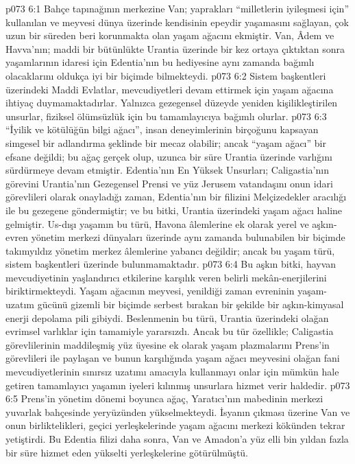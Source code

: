 \vs p073 6:1 Bahçe tapınağının merkezine Van; yaprakları “milletlerin iyileşmesi için” kullanılan ve meyvesi dünya üzerinde kendisinin epeydir yaşamasını sağlayan, çok uzun bir süreden beri korunmakta olan yaşam ağacını ekmiştir. Van, Âdem ve Havva’nın; maddi bir bütünlükte Urantia üzerinde bir kez ortaya çıktıktan sonra yaşamlarının idaresi için Edentia’nın bu hediyesine aynı zamanda bağımlı olacaklarını oldukça iyi bir biçimde bilmekteydi.
\vs p073 6:2 Sistem başkentleri üzerindeki Maddi Evlatlar, mevcudiyetleri devam ettirmek için yaşam ağacına ihtiyaç duymamaktadırlar. Yalnızca gezegensel düzeyde yeniden kişilikleştirilen unsurlar, fiziksel ölümsüzlük için bu tamamlayıcıya bağımlı olurlar.
\vs p073 6:3 “İyilik ve kötülüğün bilgi ağacı”, insan deneyimlerinin birçoğunu kapsayan simgesel bir adlandırma şeklinde bir mecaz olabilir; ancak “yaşam ağacı” bir efsane değildi; bu ağaç gerçek olup, uzunca bir süre Urantia üzerinde varlığını sürdürmeye devam etmiştir. Edentia’nın En Yüksek Unsurları; Caligastia’nın görevini Urantia’nın Gezegensel Prensi ve yüz Jerusem vatandaşını onun idari görevlileri olarak onayladığı zaman, Edentia’nın bir filizini Melçizedekler aracılığı ile bu gezegene göndermiştir; ve bu bitki, Urantia üzerindeki yaşam ağacı haline gelmiştir. Us\hyp{}dışı yaşamın bu türü, Havona âlemlerine ek olarak yerel ve aşkın\hyp{}evren yönetim merkezi dünyaları üzerinde aynı zamanda bulunabilen bir biçimde takımyıldız yönetim merkez âlemlerine yabancı değildir; ancak bu yaşam türü, sistem başkentleri üzerinde bulunmamaktadır.
\vs p073 6:4 Bu aşkın bitki, hayvan mevcudiyetinin yaşlandırıcı etkilerine karşılık veren belirli mekân\hyp{}enerjilerini biriktirmekteydi. Yaşam ağacının meyvesi, yenildiği zaman evreninin yaşam\hyp{}uzatım gücünü gizemli bir biçimde serbest bırakan bir şekilde bir aşkın\hyp{}kimyasal enerji depolama pili gibiydi. Beslenmenin bu türü, Urantia üzerindeki olağan evrimsel varlıklar için tamamiyle yararsızdı. Ancak bu tür özellikle; Caligastia görevlilerinin maddileşmiş yüz üyesine ek olarak yaşam plazmalarını Prens’in görevlileri ile paylaşan ve bunun karşılığında yaşam ağacı meyvesini olağan fani mevcudiyetlerinin sınırsız uzatımı amacıyla kullanmayı onlar için mümkün hale getiren tamamlayıcı yaşamın iyeleri kılınmış unsurlara hizmet verir haldedir.
\vs p073 6:5 Prens’in yönetim dönemi boyunca ağaç, Yaratıcı’nın mabedinin merkezi yuvarlak bahçesinde yeryüzünden yükselmekteydi. İsyanın çıkması üzerine Van ve onun birliktelikleri, geçici yerleşkelerinde yaşam ağacını merkezi kökünden tekrar yetiştirdi. Bu Edentia filizi daha sonra, Van ve Amadon’a yüz elli bin yıldan fazla bir süre hizmet eden yükselti yerleşkelerine götürülmüştü.
